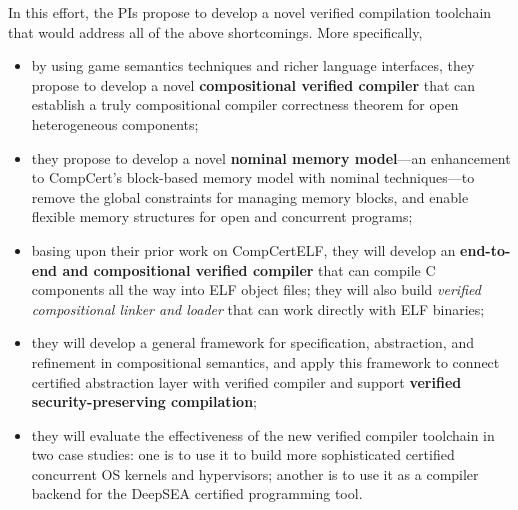 In this effort, the PIs propose to
develop a novel verified compilation toolchain that would address
all of the above shortcomings. More specifically,
\begin{itemize}
\item by using game semantics techniques and richer language interfaces,
they propose to develop a novel {\bf compositional verified compiler} that
can establish a truly compositional compiler correctness theorem for
open heterogeneous components;
\item they propose to develop a novel {\bf nominal memory model}---an
enhancement to CompCert's block-based memory model with nominal
techniques---to remove the global constraints for managing memory
blocks, and enable flexible memory structures for open and concurrent
programs;
\item basing upon their prior work on CompCertELF, they will develop an
{\bf end-to-end and compositional verified
compiler} that can compile C components all the way into ELF
object files; they will also build {\em verified compositional linker
and loader} that can work directly with ELF binaries;
\item they will develop a general
framework for specification, abstraction, and refinement in
compositional semantics, and apply this framework to connect
certified abstraction layer with verified compiler and support
{\bf verified security-preserving compilation};
\item they will evaluate the effectiveness of the new verified compiler
toolchain in two case studies: one is to use it to build more sophisticated
certified concurrent OS kernels and hypervisors; another is to
use it as a compiler backend for the DeepSEA certified programming tool.
\end{itemize}


